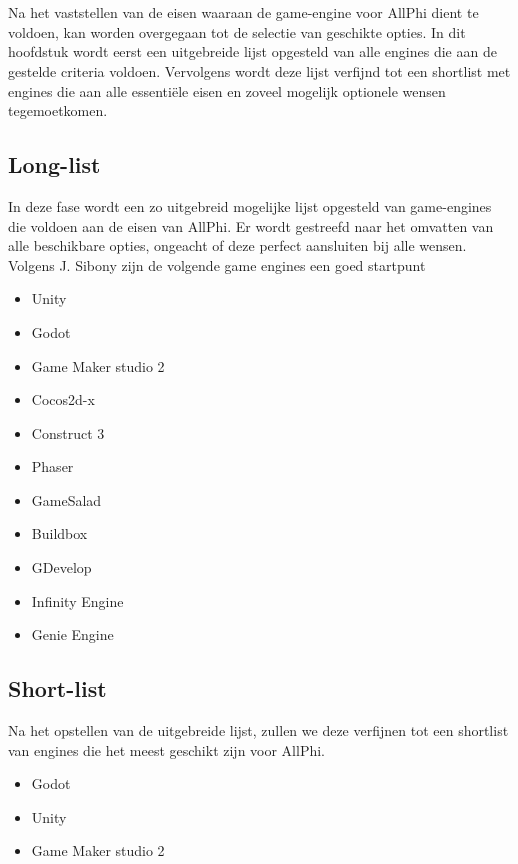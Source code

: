 
\chapter{}%
\label{ch:selectie-game-engines}

Na het vaststellen van de eisen waaraan de game-engine voor AllPhi dient te voldoen, kan worden overgegaan tot de selectie van geschikte opties. In dit hoofdstuk wordt eerst een uitgebreide lijst opgesteld van alle engines die aan de gestelde criteria voldoen. Vervolgens wordt deze lijst verfijnd tot een shortlist met engines die aan alle essentiële eisen en zoveel mogelijk optionele wensen tegemoetkomen.

\section{Long-list}

In deze fase wordt een zo uitgebreid mogelijke lijst opgesteld van game-engines die voldoen aan de eisen van AllPhi. Er wordt gestreefd naar het omvatten van alle beschikbare opties, ongeacht of deze perfect aansluiten bij alle wensen. Volgens J. Sibony zijn de volgende game engines een goed startpunt \autocite{Sibony2024}

\begin{itemize}
    \item Unity
    \item Godot
    \item Game Maker studio 2
    \item Cocos2d-x
    \item Construct 3
    \item Phaser
    \item GameSalad
    \item Buildbox
    \item GDevelop
    \item Infinity Engine
    \item Genie Engine
\end{itemize}

\section{Short-list}
Na het opstellen van de uitgebreide lijst, zullen we deze verfijnen tot een shortlist van engines die het meest geschikt zijn voor AllPhi.
\begin{itemize}
    \item Godot
    \item Unity
    \item Game Maker studio 2
\end{itemize}